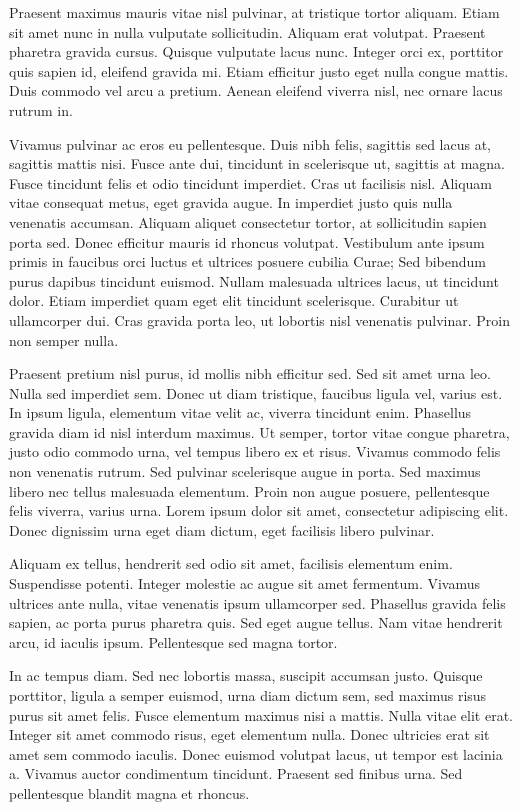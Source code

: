 \documentclass[10pt, a4paper, twocolumn]{article} %
\begin{document}
Praesent maximus mauris vitae nisl pulvinar, at tristique tortor aliquam. Etiam sit amet nunc in nulla vulputate sollicitudin. Aliquam erat volutpat. Praesent pharetra gravida cursus. Quisque vulputate lacus nunc. Integer orci ex, porttitor quis sapien id, eleifend gravida mi. Etiam efficitur justo eget nulla congue mattis. Duis commodo vel arcu a pretium. Aenean eleifend viverra nisl, nec ornare lacus rutrum in.

Vivamus pulvinar ac eros eu pellentesque. Duis nibh felis, sagittis sed lacus at, sagittis mattis nisi. Fusce ante dui, tincidunt in scelerisque ut, sagittis at magna. Fusce tincidunt felis et odio tincidunt imperdiet. Cras ut facilisis nisl. Aliquam vitae consequat metus, eget gravida augue. In imperdiet justo quis nulla venenatis accumsan. Aliquam aliquet consectetur tortor, at sollicitudin sapien porta sed. Donec efficitur mauris id rhoncus volutpat. Vestibulum ante ipsum primis in faucibus orci luctus et ultrices posuere cubilia Curae; Sed bibendum purus dapibus tincidunt euismod. Nullam malesuada ultrices lacus, ut tincidunt dolor. Etiam imperdiet quam eget elit tincidunt scelerisque. Curabitur ut ullamcorper dui. Cras gravida porta leo, ut lobortis nisl venenatis pulvinar. Proin non semper nulla.

Praesent pretium nisl purus, id mollis nibh efficitur sed. Sed sit amet urna leo. Nulla sed imperdiet sem. Donec ut diam tristique, faucibus ligula vel, varius est. In ipsum ligula, elementum vitae velit ac, viverra tincidunt enim. Phasellus gravida diam id nisl interdum maximus. Ut semper, tortor vitae congue pharetra, justo odio commodo urna, vel tempus libero ex et risus. Vivamus commodo felis non venenatis rutrum. Sed pulvinar scelerisque augue in porta. Sed maximus libero nec tellus malesuada elementum. Proin non augue posuere, pellentesque felis viverra, varius urna. Lorem ipsum dolor sit amet, consectetur adipiscing elit. Donec dignissim urna eget diam dictum, eget facilisis libero pulvinar.

Aliquam ex tellus, hendrerit sed odio sit amet, facilisis elementum enim. Suspendisse potenti. Integer molestie ac augue sit amet fermentum. Vivamus ultrices ante nulla, vitae venenatis ipsum ullamcorper sed. Phasellus gravida felis sapien, ac porta purus pharetra quis. Sed eget augue tellus. Nam vitae hendrerit arcu, id iaculis ipsum. Pellentesque sed magna tortor.

In ac tempus diam. Sed nec lobortis massa, suscipit accumsan justo. Quisque porttitor, ligula a semper euismod, urna diam dictum sem, sed maximus risus purus sit amet felis. Fusce elementum maximus nisi a mattis. Nulla vitae elit erat. Integer sit amet commodo risus, eget elementum nulla. Donec ultricies erat sit amet sem commodo iaculis. Donec euismod volutpat lacus, ut tempor est lacinia a. Vivamus auctor condimentum tincidunt. Praesent sed finibus urna. Sed pellentesque blandit magna et rhoncus.
\end{document}
